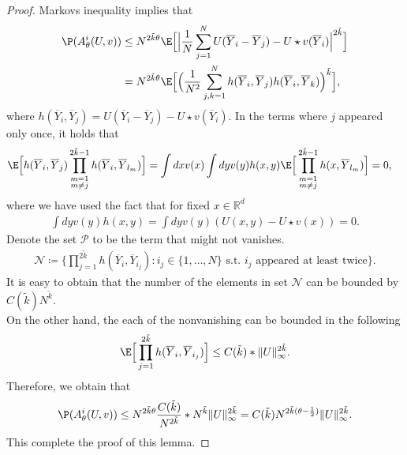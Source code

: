 \begin{proof}
	Markovs inequality   implies that 
	\begin{align*}
	\P(A_{\theta }^{i}(U,v) )&\le  N^{2 \tilde{k} \theta }  \E\Big[\Big|\frac{1}{N} \sum_{j=1}^N U(\overline{Y}_i - \overline{Y}_j) - U \star  v (\overline{Y}_i ) \Big|^{2 \tilde{k} } \Big]\\
	&=  N^{2 \tilde{k} \theta }  \E\Big[\Big(\frac{1}{N^2} \sum_{j,k=1}^{N}  h(\overline{Y}_i,\overline{Y}_j  )h(\overline{Y}_i,\overline{Y}_k  ) \Big)^{\tilde{k} } \Big]
	,\end{align*}
	where 
$h(\overline{Y}_i,\overline{Y}_j) =    U(\overline{Y}_i - \overline{Y}_j) - U \star  v (\overline{Y}_i)$.
	In the terms where $j$ appeared only once, it holds that
	\begin{align*}
	&\E\Big[h(\overline{Y}_i,\overline{Y}_j  ) \prod_{\substack{m=1\\ m\neq j}}^{2 \tilde{k}-1 } h(\overline{Y}_i , \overline{Y}_{l_m}  )\Big] 
	=  \int dx v(x) \int  dy v(y)h(x,y) \E\Big[\prod_{\substack{m=1\\ m\neq j}}^{2 \tilde{k}-1 } h(x, \overline{Y}_{l_m} )\Big] = 0 
	,\end{align*}
where we have used the fact that  for fixed $x \in  \mathbb{R}^{d} $
	\begin{align*}
	\int dy v(y)h(x,y) =  \int dy v(y) (U(x,y) - U \star  v(x)) = 0
	.\end{align*}
	Denote the set $\mathcal{P}$ to be the term that might not vanishes.
	\begin{align*}
	\mathcal{N} \coloneqq  \Big\{\prod_{j=1}^{2 \tilde{k} }h(\overline{Y}_i,\overline{Y}_{i_j}) : i_j \in  \{1 , \ldots , N\} \text{ s.t. } i_j \text{ appeared at least twice}   \Big\}  
	.\end{align*}
	It is easy to obtain that the number of the elements in set $\mathcal{N}$ can be bounded by $C(\tilde{k} )N^{\tilde{k} } $.\\[1ex]
	On the other hand, the each of the nonvanishing can be bounded in the following
	\begin{align*}
	\E\Big[\prod_{j=1}^{2 \tilde{k} }h(\overline{Y}_i,\overline{Y}_{i_j})\Big] \le  C(\tilde{k} )* \|U\|_{\infty}^{2 \tilde{k} } 
	.\end{align*}
Therefore, we obtain that 
	\begin{align*}
	\P(A_{\theta }^{i}(U,v) ) \le N^{2 \tilde{k}\theta  } \frac{C(\tilde{k} )}{N^{2 \tilde{k} } } * N^{\tilde{k} } \|U\|_{\infty}^{2 \tilde{k} }  = C(\tilde{k}) N^{2 \tilde{k}(\theta  - \frac{1}{2}) } \|U\|_{\infty}^{2 \tilde{k} }  
	.\end{align*}
This complete the proof of this lemma.
\end{proof}

